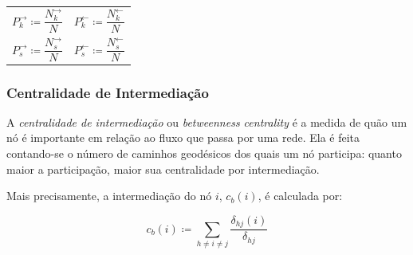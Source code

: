 \documentclass[12pt,a4paper,final]{article}
\newcommand{\defn}{\coloneqq} %
\newcommand{\linkin}[1]{#1^\leftarrow} %
\newcommand{\linkout}[1]{#1^\rightarrow} %
\begin{document}
\noindent
\begin{tabularx}{\linewidth}{@{}XX@{}}
  \begin{equation} \label{eq:probabilidade-grau-saida}
  	\linkout{P}_k \defn \frac{\linkout{N}_k}{N}
  \end{equation} &
  \begin{equation} \label{eq:probabilidade-grau-entrada}
  	\linkin{P}_k \defn \frac{\linkin{N}_k}{N}
  \end{equation} \\
  \begin{equation} \label{eq:probabilidade-forca-saida}
  	\linkout{P}_s \defn \frac{\linkout{N}_s}{N}
  \end{equation} &
  \begin{equation} \label{eq:probabilidade-forca-entrada}
  	\linkin{P}_s \defn \frac{\linkin{N}_s}{N}
  \end{equation}
\end{tabularx}

\subsubsection{Centralidade de Intermediação} \label{sec:intermediacao}

A \textit{centralidade de intermediação} ou \textit{betweenness centrality} é a medida de quão um nó é importante em relação ao fluxo que passa por uma rede. Ela é feita contando-se o número de caminhos geodésicos dos quais um nó participa: quanto maior a participação, maior sua centralidade por intermediação.

Mais precisamente, a intermediação do nó $i$, $c_b(i)$, é calculada por:

\begin{equation}
c_b(i) \defn \sum_{h \neq i \neq j} \frac{\delta_{hj}(i)}{\delta_{hj}}
\end{equation}
\end{document}
